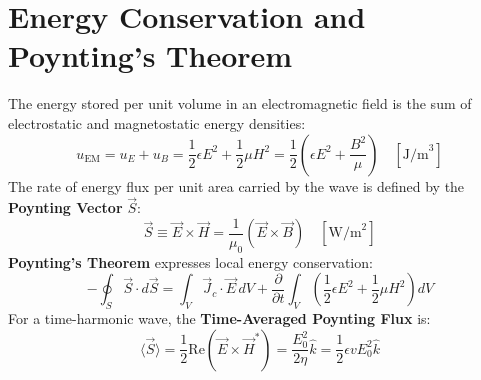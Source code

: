 \section{Energy Conservation and Poynting's Theorem}
The energy stored per unit volume in an electromagnetic field is the sum of electrostatic and magnetostatic energy densities:
\begin{equation}
u_{\text{EM}} = u_E + u_B = \frac{1}{2}\epsilon E^2 + \frac{1}{2}\mu H^2 = \frac{1}{2}\left( \epsilon E^2 + \frac{B^2}{\mu} \right) \quad \left[\text{J/m}^3\right]
\end{equation}
The rate of energy flux per unit area carried by the wave is defined by the \textbf{Poynting Vector} $\vec{S}$:
\begin{equation}
\vec{S} \equiv \vec{E} \times \vec{H} = \frac{1}{\mu_0}(\vec{E} \times \vec{B}) \quad \left[\text{W/m}^2\right]
\end{equation}
\textbf{Poynting's Theorem} expresses local energy conservation:
\begin{equation}
-\oint_S \vec{S} \cdot d\vec{S} = \int_V \vec{J}_c \cdot \vec{E} \, dV + \frac{\partial}{\partial t}\int_V \left(\frac{1}{2}\epsilon E^2 + \frac{1}{2}\mu H^2\right) dV
\end{equation}
For a time-harmonic wave, the \textbf{Time-Averaged Poynting Flux} is:
\begin{equation}
\langle \vec{S} \rangle = \frac{1}{2}\text{Re}\left( \vec{E} \times \vec{H}^* \right) = \frac{E_0^2}{2\eta}\hat{k} = \frac{1}{2}\epsilon v E_0^2 \hat{k}
\end{equation}

